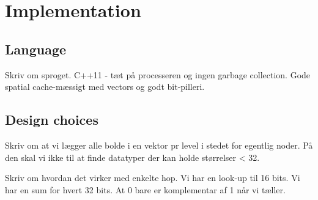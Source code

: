 \chapter{Implementation}

\section{Language}

Skriv om sproget. C++11 - tæt på processeren og ingen garbage collection. Gode spatial cache-mæssigt med vectors og godt bit-pilleri.

\section{Design choices}

Skriv om at vi lægger alle bolde i en vektor pr level i stedet for egentlig noder. På den skal vi ikke til at finde datatyper der kan holde størrelser < 32.

Skriv om hvordan det virker med enkelte hop. Vi har en look-up til 16 bits. Vi har en sum for hvert 32 bits. At 0 bare er komplementar af 1 når vi tæller.
